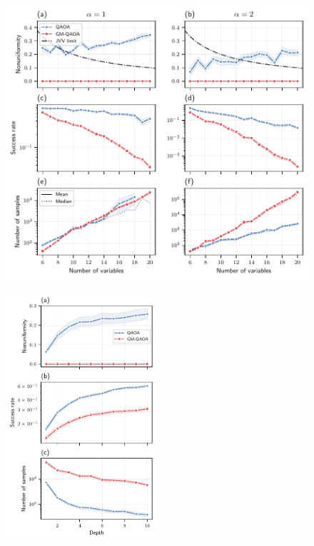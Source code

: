 \begin{figure}[h]
    \centering
    \includegraphics[width=1\textwidth]{figures/nae3sat-number-of-samples.pdf}
    \caption{}
    \label{fig:nae3sat-number-of-samples}
\end{figure}

\begin{figure}[h]
    \centering
    \includegraphics[width=0.5\textwidth]{figures/nae3sat-depth.pdf}
    \caption{}
    \label{fig:nae3sat-depth}
\end{figure}

